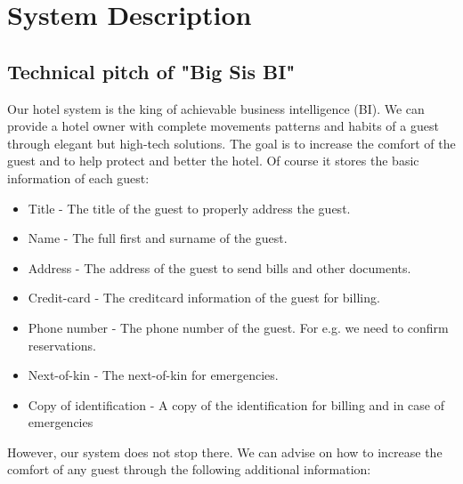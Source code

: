 \chapter{System Description}
\label{chap:system_description}

\section{Technical pitch of "Big Sis BI"}
Our hotel system is the king of achievable business intelligence (BI). We can provide a hotel owner with complete movements patterns and habits of a guest through elegant but high-tech solutions. The goal is to increase the comfort of the guest and to help protect and better the hotel. Of course it stores the basic information of each guest:

\begin{itemize}
	\item Title - The title of the guest to properly address the guest.
	\item Name - The full first and surname of the guest.
	\item Address - The address of the guest to send bills and other documents.
	\item Credit-card - The creditcard information of the guest for billing.
	\item Phone number - The phone number of the guest. For e.g. we need to confirm reservations.
	\item Next-of-kin - The next-of-kin for emergencies.
	\item Copy of identification - A copy of the identification for billing and in case of emergencies
\end{itemize}

However, our system does not stop there. We can advise on how to increase the comfort of any guest through the following additional information:

